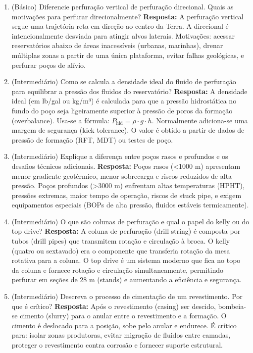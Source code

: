\documentclass[11pt,a4paper]{article}
\begin{document}
\begin{enumerate}
  \item (Básico) Diferencie perfuração vertical de perfuração direcional. Quais as motivações para perfurar direcionalmente?
  \textbf{Resposta:} A perfuração vertical segue uma trajetória reta em direção ao centro da Terra. A direcional é intencionalmente desviada para atingir alvos laterais. Motivações: acessar reservatórios abaixo de áreas inacessíveis (urbanas, marinhas), drenar múltiplas zonas a partir de uma única plataforma, evitar falhas geológicas, e perfurar poços de alívio.

  \item (Intermediário) Como se calcula a densidade ideal do fluido de perfuração para equilibrar a pressão dos fluidos do reservatório?
  \textbf{Resposta:} A densidade ideal (em lb/gal ou kg/m³) é calculada para que a pressão hidrostática no fundo do poço seja ligeiramente superior à pressão de poros da formação (overbalance). Usa-se a fórmula: $P_{\text{hid}} = \rho \cdot g \cdot h$. Normalmente adiciona-se uma margem de segurança (kick tolerance). O valor é obtido a partir de dados de pressão de formação (RFT, MDT) ou testes de poço.

  \item (Intermediário) Explique a diferença entre poços rasos e profundos e os desafios técnicos adicionais.
  \textbf{Resposta:} Poços rasos (<1000 m) apresentam menor gradiente geotérmico, menor sobrecarga e riscos reduzidos de alta pressão. Poços profundos (>3000 m) enfrentam altas temperaturas (HPHT), pressões extremas, maior tempo de operação, riscos de stuck pipe, e exigem equipamentos especiais (BOPs de alta pressão, fluidos estáveis termicamente).

  \item (Intermediário) O que são colunas de perfuração e qual o papel do kelly ou do top drive?
  \textbf{Resposta:} A coluna de perfuração (drill string) é composta por tubos (drill pipes) que transmitem rotação e circulação à broca. O kelly (quatro ou sextavado) era o componente que transferia rotação da mesa rotativa para a coluna. O top drive é um sistema moderno que fica no topo da coluna e fornece rotação e circulação simultaneamente, permitindo perfurar em seções de 28 m (stands) e aumentando a eficiência e segurança.

  \item (Intermediário) Descreva o processo de cimentação de um revestimento. Por que é crítico?
  \textbf{Resposta:} Após o revestimento (casing) ser descido, bombeia-se cimento (slurry) para o anular entre o revestimento e a formação. O cimento é deslocado para a posição, sobe pelo anular e endurece. É crítico para: isolar zonas produtoras, evitar migração de fluidos entre camadas, proteger o revestimento contra corrosão e fornecer suporte estrutural.


\end{enumerate}
\end{document}
